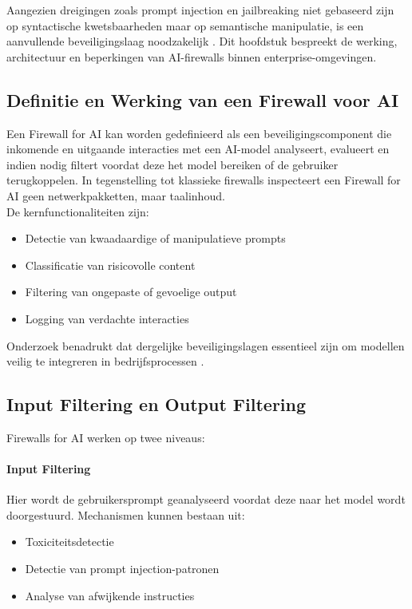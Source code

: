 Aangezien dreigingen zoals prompt injection en jailbreaking niet gebaseerd zijn op syntactische kwetsbaarheden maar op semantische manipulatie, is een aanvullende beveiligingslaag noodzakelijk \autocite{owasp2023llm}. Dit hoofdstuk bespreekt de werking, architectuur en beperkingen van AI-firewalls binnen enterprise-omgevingen.\\

\subsection{Definitie en Werking van een Firewall voor AI}

Een Firewall for AI kan worden gedefinieerd als een beveiligingscomponent die inkomende en uitgaande interacties met een AI-model analyseert, evalueert en indien nodig filtert voordat deze het model bereiken of de gebruiker terugkoppelen. In tegenstelling tot klassieke firewalls inspecteert een Firewall for AI geen netwerkpakketten, maar taalinhoud.\\

De kernfunctionaliteiten zijn:

\begin{itemize}
    \item Detectie van kwaadaardige of manipulatieve prompts
    \item Classificatie van risicovolle content
    \item Filtering van ongepaste of gevoelige output
    \item Logging van verdachte interacties
\end{itemize}

Onderzoek benadrukt dat dergelijke beveiligingslagen essentieel zijn om modellen veilig te integreren in bedrijfsprocessen \autocite{bommasani2021opportunities}.

\subsection{Input Filtering en Output Filtering}

Firewalls for AI werken op twee niveaus:

\paragraph{Input Filtering}
Hier wordt de gebruikersprompt geanalyseerd voordat deze naar het model wordt doorgestuurd. Mechanismen kunnen bestaan uit:
\begin{itemize}
    \item Toxiciteitsdetectie
    \item Detectie van prompt injection-patronen
    \item Analyse van afwijkende instructies
\end{itemize}

